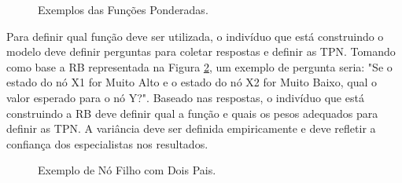 \begin{figure}[ht!]
\begin{center}
	\end{center}
	\caption{Exemplos das Funções Ponderadas.}
	\label{fundamentacao:redes:construcao:funcoes:ponderadas}
\end{figure}

Para definir qual função deve ser utilizada, o indivíduo que está construindo o modelo deve definir perguntas para coletar respostas e definir as TPN. Tomando como base a RB representada na Figura \ref{fundamentacao:redes:construcao:funcoes:bn1}, um exemplo de pergunta seria: "Se o estado do nó X1 for Muito Alto e o estado do nó X2 for Muito Baixo, qual o valor esperado para o nó Y?". Baseado nas respostas, o indivíduo que está construindo a RB deve definir qual a função e quais os pesos adequados para definir as TPN. A variância deve ser definida empiricamente e deve refletir a confiança dos especialistas nos resultados.

\begin{figure}[ht!]
\begin{center}
	\end{center}
	\caption{Exemplo de Nó Filho com Dois Pais.}
	\label{fundamentacao:redes:construcao:funcoes:bn1}
\end{figure}

